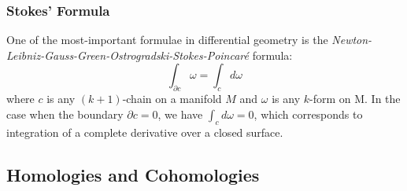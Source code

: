 \subsubsection{Stokes' Formula}
One of the most-important formulae in differential geometry is the
\textit{Newton-Leibniz-Gauss-Green-Ostrogradski-Stokes-Poincar\'e} formula:
\begin{equation}
  \boxed{\int_{\partial c}{\omega} = \int_c{d\omega}}
\end{equation}
where $c$ is any $(k+1)$-chain on a manifold $M$ and $\omega$ is any $k$-form
on M. In the case when the boundary $\partial c=0$, we have $\int_c{d\omega}
= 0$, which corresponds to integration of a complete derivative over a closed
surface.
\subsection{Homologies and Cohomologies}
